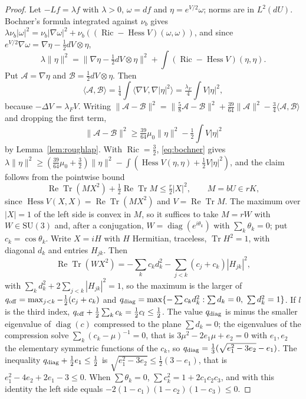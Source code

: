 \documentclass[11pt]{amsart}
\theoremstyle{definition}
\theoremstyle{remark}
\numberwithin{equation}{section}
\newcommand{\SU}{\mathrm{SU}}
\newcommand{\Tr}{\operatorname{Tr}}
\newcommand{\ReTr}{\operatorname{Re}\operatorname{Tr}}
\newcommand{\Hess}{\operatorname{Hess}}
\newcommand{\Ric}{\operatorname{Ric}}
\newcommand{\ip}[2]{\langle #1,#2\rangle}
\begin{document}
\begin{proof}
Let $-Lf=\lambda f$ with $\lambda>0$, $\omega=df$ and $\eta=e^{V/2}\omega$;
norms are in $L^2(dU)$. Bochner's formula integrated against $\nu_b$ gives
$\lambda\nu_b|\omega|^2=\nu_b|\nabla\omega|^2+\nu_b((\Ric-\Hess V)(\omega,
\omega))$, and since $e^{V/2}\nabla\omega=\nabla\eta-\frac12dV\otimes\eta$,
\begin{equation}\label{eq:bochner}
\lambda\|\eta\|^2=\|\nabla\eta-\tfrac12dV\otimes\eta\|^2+\int(\Ric-\Hess V)
(\eta,\eta).
\end{equation}
Put $\mathcal A=\nabla\eta$ and $\mathcal B=\frac12dV\otimes\eta$. Then
\[
\ip{\mathcal A}{\mathcal B}=\tfrac14\int\ip{\nabla V}{\nabla|\eta|^2}
=\tfrac{\lambda_F}4\int V|\eta|^2 ,
\]
because $-\Delta V=\lambda_FV$. Writing $\|\mathcal A-\mathcal B\|^2=
\|\frac58\mathcal A-\mathcal B\|^2+\frac{39}{64}\|\mathcal A\|^2-\frac34
\ip{\mathcal A}{\mathcal B}$ and dropping the first term,
\[
\|\mathcal A-\mathcal B\|^2\ge\tfrac{39}{64}\mu_0\|\eta\|^2-\tfrac12\int
V|\eta|^2
\]
by Lemma~\ref{lem:roughlap}. With $\Ric=\frac32$, \eqref{eq:bochner} gives
$\lambda\|\eta\|^2\ge(\frac{39}{64}\mu_0+\frac32)\|\eta\|^2-\int(\Hess V(\eta,
\eta)+\frac12V|\eta|^2)$, and the claim follows from the pointwise bound
\begin{equation}\label{eq:pointwise}
\ReTr(MX^2)+\tfrac12\ReTr M\le\tfrac r2|X|^2,\qquad M=bU\in rK ,
\end{equation}
since $\Hess V(X,X)=\ReTr(MX^2)$ and $V=\ReTr M$. The maximum over $|X|=1$ of
the left side is convex in $M$, so it suffices to take $M=rW$ with $W\in
\SU(3)$ and, after a conjugation, $W=\operatorname{diag}(e^{i\theta_k})$ with
$\sum_k\theta_k=0$; put $c_k=\cos\theta_k$. Write $X=iH$ with $H$ Hermitian,
traceless, $\Tr H^2=1$, with diagonal $d_k$ and entries $H_{jk}$. Then
\[
\ReTr(WX^2)=-\sum_kc_kd_k^2-\sum_{j<k}(c_j+c_k)|H_{jk}|^2 ,
\]
with $\sum_kd_k^2+2\sum_{j<k}|H_{jk}|^2=1$, so the maximum is the larger of
$q_{\rm off}=\max_{j<k}-\frac12(c_j+c_k)$ and $q_{\rm diag}=\max\{-\sum c_kd_k^2:
\sum d_k=0,\ \sum d_k^2=1\}$. If $l$ is the third index, $q_{\rm off}+\frac12
\sum_kc_k=\frac12c_l\le\frac12$. The value $q_{\rm diag}$ is minus the smaller
eigenvalue of $\operatorname{diag}(c)$ compressed to the plane $\sum d_k=0$;
the eigenvalues of the compression solve $\sum_k(c_k-\mu)^{-1}=0$, that is
$3\mu^2-2e_1\mu+e_2=0$ with $e_1,e_2$ the elementary symmetric functions of
the $c_k$, so $q_{\rm diag}=\frac13(\sqrt{e_1^2-3e_2}-e_1)$. The inequality
$q_{\rm diag}+\frac12e_1\le\frac12$ is $\sqrt{e_1^2-3e_2}\le\frac12(3-e_1)$, that
is $e_1^2-4e_2+2e_1-3\le0$. When $\sum\theta_k=0$, $\sum c_k^2=1+2c_1c_2c_3$,
and with this identity the left side equals $-2(1-c_1)(1-c_2)(1-c_3)\le0$.
\end{proof}
\end{document}
